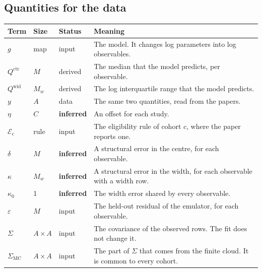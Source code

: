 \documentclass[11pt]{article}
\newcommand{\ctr}{\mathrm{ctr}}
\newcommand{\wid}{\mathrm{wid}}
\newcommand{\INF}{\textcolor{accent}{\textbf{inferred}}}
\newcommand{\FIX}{\textcolor{softgray}{input}}
\newcommand{\DER}{\textcolor{softgray}{derived}}
\newcommand{\OBS}{\textcolor{softgray}{data}}
\begin{document}
\subsection*{Quantities for the data}
\begin{center}\small
\begin{tabularx}{\textwidth}{@{}lllX@{}}
\toprule
Term & Size & Status & Meaning \\
\midrule
$g$ & map & \FIX & The model. It changes log parameters into log observables. \\
$Q^\ctr$ & $M$ & \DER & The median that the model predicts, per observable. \\
$Q^\wid$ & $M_w$ & \DER & The log interquartile range that the model predicts. \\
$y$ & $A$ & \OBS & The same two quantities, read from the papers. \\
$\eta$ & $C$ & \INF & An offset for each study. \\
$\mathcal{E}_c$ & rule & \FIX & The eligibility rule of cohort $c$, where the paper reports one. \\
$\delta$ & $M$ & \INF & A structural error in the centre, for each observable. \\
$\kappa$ & $M_w$ & \INF & A structural error in the width, for each observable with a width row. \\
$\kappa_0$ & 1 & \INF & The width error shared by every observable. \\
$\varepsilon$ & $M$ & \FIX & The held-out residual of the emulator, for each observable. \\
$\Sigma$ & $A\times A$ & \FIX & The covariance of the observed rows. The fit does not change it. \\
$\Sigma_{\text{MC}}$ & $A\times A$ & \FIX & The part of $\Sigma$ that comes from the finite cloud. It is common to every cohort. \\
\bottomrule
\end{tabularx}
\end{center}
\end{document}
